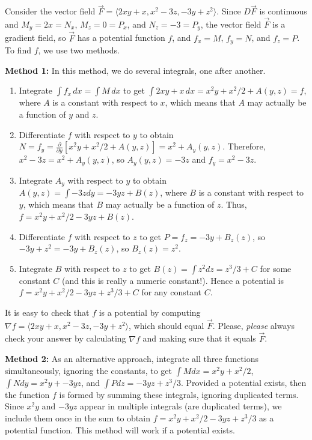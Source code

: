\begin{example} Consider the vector field $\vec
F=\langle2xy+x,x^2-3z,-3y+z^2\rangle$. Since $D\vec F$ is continuous and
$M_y=2x=N_x$, $M_z=0=P_x$, and $N_z=-3=P_y$, the vector field $\vec F$ is a
gradient field, so $\vec F$ has a potential function $f$, and $f_x=M$,
$f_y=N$, and $f_z=P$.  To find $f$, we use two methods.

\textbf{Method 1:} In this method, we do several integrals, one after another.
\begin{enumerate}
\item Integrate $\int f_x\,dx=\int M\,dx$ to get $\int 2xy+x\,dx =
  x^2y+x^2/2+A(y,z)=f$, where $A$ is a constant with respect to $x$,
  which means that $A$ may actually be a function of $y$ and $z$.
\item Differentiate $f$ with respect to $y$ to obtain
  $N=f_y=\frac{\partial}{\partial y}[x^2y+x^2/2+A(y,z)] = x^2+A_y(y,z)$. Therefore,
  $x^2-3z=x^2+A_y(y,z)$, so $A_y(y,z)= -3z$ and $f_y=x^2-3z$.
\item Integrate $A_y$ with respect to $y$ to obtain $A(y,z)=\int -3z dy =
  -3yz+B(z)$, where $B$ is a constant with respect to $y$, which means
  that $B$ may actually be a function of $z$.  Thus,
  $f=x^2y+x^2/2-3yz+B(z)$.
\item Differentiate $f$ with respect to $z$ to get $P=f_z=-3y+B_z(z)$,
  so $-3y+z^2=-3y+B_z(z)$, so $B_z(z)=z^2$.
\item Integrate $B$ with respect to $z$ to get $B(z)=\int z^2 dz =
  z^3/3+C$ for some constant $C$ (and this is really a numeric
  constant!).  Hence a potential is $f= x^2y+x^2/2-3yz+z^3/3+C$ for
  any constant $C$.
\end{enumerate}

It is easy to check that $f$ is a potential by computing $\nabla f =
\langle2xy+x,x^2-3z,-3y+z^2\rangle$, which should equal $\vec F$.
Please, \emph{please} always check your answer by calculating $\nabla
f$ and making sure that it equals $\vec F$.

\textbf{Method 2:} As an alternative approach, integrate all three
functions simultaneously, ignoring the constants, to get $\int M dx =
x^2y+x^2/2$, $\int N dy = x^2y+-3yz$, and $\int P dz = -3yz +z^3/3$.
Provided a potential exists, then the function $f$ is formed by
summing these integrals, ignoring duplicated terms. Since $x^2y$ and
$-3yz$ appear in multiple integrals (are duplicated terms), we include
them once in the sum to obtain $f= x^2y+x^2/2-3yz+z^3/3$ as a
potential function. This method will work if a potential exists.
\end{example}

